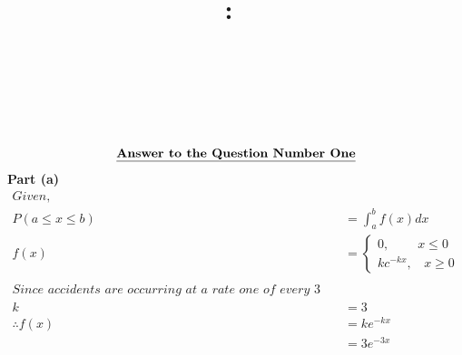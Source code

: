 \documentclass{article}
\title{
    \vspace{2in}
    \textmd{\textbf{\hmwkClass:\ \hmwkTitle}}\\
    \normalsize\vspace{0.1in}\small{ \hmwkDueDate}\\
    \vspace{0.1in}\large{\textit{\hmwkClassInstructor\ \hmwkClassTime}}
    \vspace{3in}
}
\author{\hmwkAuthorName}
\date{}
\begin{document}
\maketitle


                
\begin{homeworkProblem}
    \[      \textbf{\underline{Answer to the Question Number One}}
    \]
    \textbf{Part (a)}
    \\
    \[
    \begin{split}
        Given,&
        \\
        P(a \leq x \leq b) &= \int_{a}^{b} f(x) dx 
        \\
        f(x) &=
        \begin{cases}
                0 , \ \ \ \ \ \ \ \ \ \  x \leq 0 
                \\
                kc^{-kx} , \ \ \ \ x \geq 0 
        \end{cases}
        \\ \\
        \textit{Since accidents are occurring at a rate one of every 3 months,}
        \\
         k &= 3 
        \\
        \therefore f(x) &= k e^{-kx}
        \\
        &= 3 e^{-3x}
    \end{split}
    \]
\end{homeworkProblem}
\\ \\ \\ \\ \\ 
\end{document}

